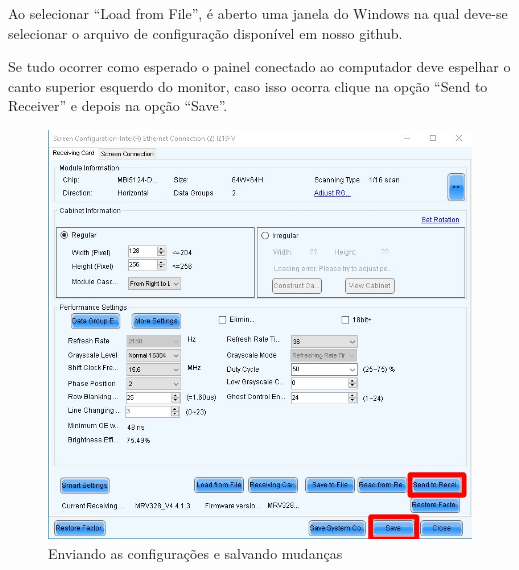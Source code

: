 \documentclass[12pt, a4paper]{article}
\begin{document}
Ao selecionar ``Load from File'', é aberto uma janela do Windows na qual deve-se selecionar o arquivo de configuração disponível em nosso github\cite{arquivoConfig}.

\newpage
Se tudo ocorrer como esperado o painel conectado ao computador deve espelhar o canto superior esquerdo do monitor, caso isso ocorra clique na opção ``Send to Receiver'' e depois na opção ``Save''.
\begin{figure}[!htb]
	\centering
	\includegraphics[width=\textwidth]{Save.jpeg}
	\caption{\label{fig:Save.jpeg}Enviando as configurações e salvando mudanças}
\end{figure}

\newpage
\end{document}

